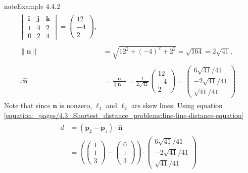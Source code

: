 \documentclass[letterpaper,10pt,english]{jupyterBook}
\begin{document}
\begin{sphinxadmonition}{note}{Example 4.4.2}
\begin{equation*}
\begin{split}
\begin{align*}
\begin{vmatrix}
        \mathbf{i} & \mathbf{j} & \mathbf{k} \\
        1 & 4 & 2 \\
        0 & 2 & 4
    \end{vmatrix} =
    \begin{pmatrix} 12 \\ -4 \\ 2 \end{pmatrix}, \\ \\
    \|\mathbf{n}\| &= \sqrt{12^2 + (-4)^2 + 2^2} = \sqrt{164} = 2\sqrt{41}, \\ \\
    \therefore \hat{\mathbf{n}} &= \frac{\mathbf{n}}{\|\mathbf{n}\|}
    = \frac{1}{2\sqrt{41}}
    \begin{pmatrix} 12 \\ -4 \\ 2 \end{pmatrix}
    =
    \begin{pmatrix} 6\sqrt{41}/41 \\ -2\sqrt{41}/41 \\ \sqrt{41}/41 \end{pmatrix}.
\end{align*} \end{split}
\end{equation*}
\sphinxAtStartPar
Note that since \(\mathbf{n}\) is non\sphinxhyphen{}zero, \(\ell_1\) and \(\ell_2\) are skew lines. Using equation \eqref{equation:_pages/4.3_Shortest_distance_problems:line-line-distance-equation}
\begin{equation*}
\begin{split} \begin{align*}
    d &= (\mathbf{p}_2 - \mathbf{p}_1) \cdot \hat{\mathbf{n}} \\
    &= \left( \begin{pmatrix} 1 \\ 1 \\ 3 \end{pmatrix} -
    \begin{pmatrix} 0 \\ 1 \\ 3 \end{pmatrix} \right) \cdot
    \begin{pmatrix} 6\sqrt{41}/41 \\ -2\sqrt{41}/41 \\ \sqrt{41}/41 \end{pmatrix} \\ \\

\end{align*}
\end{split}
\end{equation*}
\end{sphinxadmonition}
\end{document}
